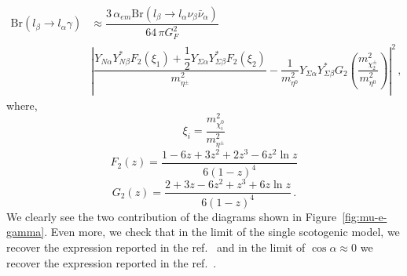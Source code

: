 \documentclass[12pt,letterpaper]{article}
\begin{document}
%
\begin{align}
\label{eq:mu-e-gamma}
\text{Br}(l_{\beta}\rightarrow l_{\alpha}\gamma) &\approx
\dfrac{3\,\alpha_{em}\text{Br}(l_{\beta}\rightarrow l_{\alpha}\nu_{\beta}\bar{\nu}_{\alpha})}{64\,\pi G_F^2 } \nonumber \\
&\left|\dfrac{Y_{N\alpha}Y_{N\beta}^* F_2\left(\xi_1\right)
+\dfrac{1}{2}Y_{\Sigma\alpha}Y_{\Sigma\beta}^* F_2\left(\xi_2\right)
}{m_{\eta^{\pm}}^2}
-\dfrac{1}{m_{\eta^{0}}^2}Y_{\Sigma\alpha}Y_{\Sigma\beta}^* G_2\left(\dfrac{m_{\chi^{\pm}_2}^2}{m_{\eta^{0}}^2}\right)
\right|^2 \,,
\end{align}
%
where,
%
\begin{equation}
\xi_i=\dfrac{ m_{\chi_i^0}^2 }{  m_{\eta^{\pm}}^2 }
\end{equation}
%
%
\begin{equation}
\label{eq:F2}
F_2(z)=\dfrac{1-6z+3z^2+2z^3-6z^2\ln{z}}{6(1-z)^4}
\end{equation}
%
\begin{equation}
\label{eq:G2}
G_2(z)=\dfrac{2+3z-6z^2+z^3+6z\ln{z}}{6(1-z)^4}\,.
\end{equation}
%
We clearly see the two contribution of the diagrams shown in Figure~\ref{fig:mu-e-gamma}. Even more, we check that in the limit of the single scotogenic model, we recover the expression reported in the ref.~\cite{Ibarra:2016dlb} and in the limit of $\cos\alpha\approx 0$ we recover the expression reported in the ref.~\cite{Rocha-Moran:2016enp}.
%
\end{document}

